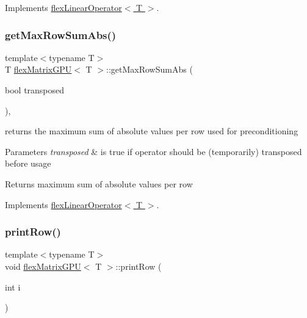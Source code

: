 Implements \hyperlink{classflex_linear_operator_a0a0a431d43f4f9d36cbee0d31ba5a29b}{flex\+Linear\+Operator$<$ T $>$}.

\mbox{\label{classflex_matrix_g_p_u_aae4f81a403b6fff8ac73ccdf6c21399f}} 
\subsubsection{\texorpdfstring{get\+Max\+Row\+Sum\+Abs()}{getMaxRowSumAbs()}}
{\footnotesize\ttfamily template$<$typename T$>$ \\
T \hyperlink{classflex_matrix_g_p_u}{flex\+Matrix\+G\+PU}$<$ T $>$\+::get\+Max\+Row\+Sum\+Abs (\begin{DoxyParamCaption}\item[{bool}]{transposed }\end{DoxyParamCaption})\hspace{0.3cm}{\ttfamily [inline]}, {\ttfamily [virtual]}}



returns the maximum sum of absolute values per row used for preconditioning 


\begin{DoxyParams}{Parameters}
{\em transposed} & is true if operator should be (temporarily) transposed before usage \\
\hline
\end{DoxyParams}
\begin{DoxyReturn}{Returns}
maximum sum of absolute values per row 
\end{DoxyReturn}


Implements \hyperlink{classflex_linear_operator_afcb74697385ccb7c8d29870d7034c12a}{flex\+Linear\+Operator$<$ T $>$}.

\mbox{\label{classflex_matrix_g_p_u_a8de9cdb55021d3c25c56daf9a081d487}} 
\subsubsection{\texorpdfstring{print\+Row()}{printRow()}}
{\footnotesize\ttfamily template$<$typename T$>$ \\
void \hyperlink{classflex_matrix_g_p_u}{flex\+Matrix\+G\+PU}$<$ T $>$\+::print\+Row (\begin{DoxyParamCaption}\item[{int}]{i }\end{DoxyParamCaption})\hspace{0.3cm}{\ttfamily [inline]}}



